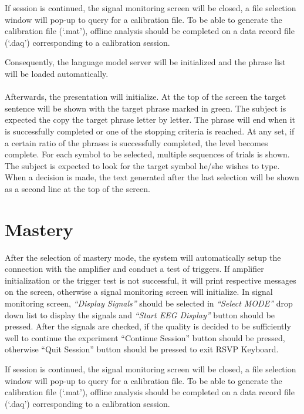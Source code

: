 \documentclass[12pt,letterpaper]{report}
\begin{document}
If session is continued, the signal monitoring screen will be closed, a file selection window will pop-up to query for a calibration file. To be able to generate the calibration file (`.mat'), offline analysis should be completed on a data record file (`.daq') corresponding to a calibration session. 

Consequently, the language model server will be initialized and the phrase list will be loaded automatically.\\
\\ 

Afterwards, the presentation will initialize. At the top of the screen the target sentence will be shown with the target phrase marked in green. The subject is expected the copy the target phrase letter by letter. The phrase will end when it is successfully completed or one of the stopping criteria is reached. At any set, if a certain ratio of the phrases is successfully completed, the level becomes complete. For each symbol to be selected, multiple sequences of trials is shown. The subject is expected to look for the target symbol he/she wishes to type. When a decision is made, the text generated after the last selection will be shown as a second line at the top of the screen.
\section{Mastery}
After the selection of mastery mode, the system will automatically setup the connection with the amplifier and conduct a test of triggers. If amplifier initialization or the trigger test is not successful, it will print respective messages on the screen, otherwise a signal monitoring screen will initialize. In signal monitoring screen, \textit{``Display Signals''} should be selected in \textit{``Select MODE''} drop down list to display the signals and \textit{``Start EEG Display''} button should be pressed. After the signals are checked, if the quality is decided to be sufficiently well to continue the experiment ``Continue Session'' button should be pressed, otherwise ``Quit Session'' button should be pressed to exit RSVP Keyboard\texttrademark .

If session is continued, the signal monitoring screen will be closed, a file selection window will pop-up to query for a calibration file. To be able to generate the calibration file (`.mat'), offline analysis should be completed on a data record file (`.daq') corresponding to a calibration session. 
\end{document}
